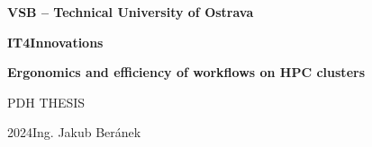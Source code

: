 \documentclass[11pt]{article}
\newcommand{\BookCover}[7]
{
	\sffamily
	\begin{center}
		\Huge
		\textbf{#1}\par\medskip
		\textbf{#2}\par
		\vspace{#3}
		\textbf{#4}\par\bigskip
		#5
	\end{center}
	\vfill
	{\Huge#6\hfill#7}
	\clearpage
}
\begin{document}
\BookCover{VSB -- Technical University of Ostrava}{IT4Innovations}{54mm}{Ergonomics and efficiency of workflows on HPC clusters}{PDH THESIS}{2024}{Ing. Jakub Beránek}
\end{document}
